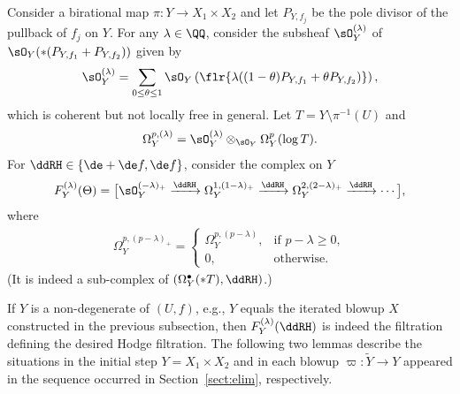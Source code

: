 Consider a birational map $\pi\colon Y \to X_1\times X_2$ and let $P_{Y,f_j}$ be the pole divisor of the pullback of $f_j$ on $Y$. For any $\lambda\in\QQ$, consider the subsheaf $\sO_Y^{(\lambda)}$ of $\sO_Y(*(P_{Y,f_1}+P_{Y,f_2}))$ given by
\begin{gather*} \sO_Y^{(\lambda)} = \sum_{0\leq\theta\leq1} \sO_Y\left(\flr{\lambda((1-\theta) P_{Y,f_1} + \theta P_{Y,f_2})}\right), \end{gather*}
which is coherent but not locally free in general. Let $T = Y\setminus \pi^{-1}(U)$ and
\begin{gather*} \Omega_Y^{p,(\lambda)} = \sO_Y^{(\lambda)} \otimes_{\sO_Y} \Omega_Y^p(\log T). \end{gather*}
For $\ddRH \in \{\de +\de f, \de f\}$, consider the complex on $Y$
\begin{gather*} F_Y^{(\lambda)}(\Theta) = \big[ \sO_Y^{(-\lambda)_+} \xrightarrow{\ddRH} \Omega_Y^{1,(1-\lambda)_+}	\xrightarrow{\ddRH} \Omega_Y^{2,(2-\lambda)_+}	\xrightarrow{\ddRH} \cdots \big], \end{gather*}
where
\begin{gather*} \Omega_Y^{p,(p-\lambda)_+} = \begin{cases}
\Omega_Y^{p,(p-\lambda)}, & \text{if $p-\lambda \geq 0$}, \\
0 ,& \text{otherwise}. \end{cases} \end{gather*}
(It is indeed a sub-complex of $(\Omega_Y^\bullet(*T),\ddRH)$.)

If $Y$ is a non-degenerate {\cpt} of $(U,f)$, e.g., $Y$ equals the iterated blowup $X$ constructed in the previous subsection, then $F_Y^{(\lambda)}(\ddRH)$ is indeed the filtration defining the desired Hodge filtration.
The following two lemmas describe the situations in the initial step $Y = X_1\times X_2$ and in each blowup $\varpi\colon \widetilde{Y}\to Y$ appeared in the sequence occurred in Section~\ref{sect:elim}, respectively.

